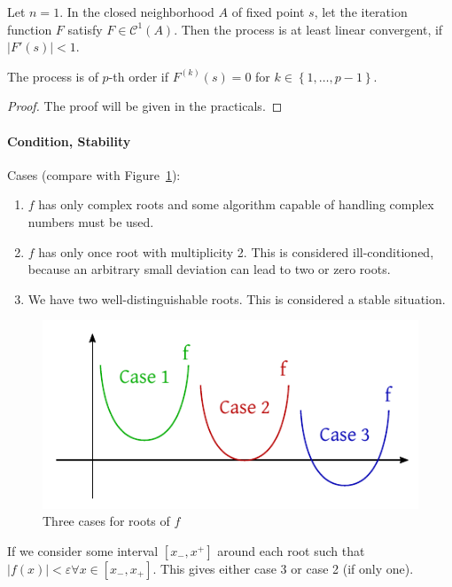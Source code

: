 \documentclass[a4paper]{article}
\numberwithin{lecref}{section}
\theoremstyle{break}
\newcommand{\Abs}[1]{\left|#1\right|}
\newcommand{\Set}[1]{\left\{#1\right\}}
\begin{document}
\begin{theorem}
  \label{theorem:6-5}
  Let $n=1$. In the closed neighborhood $A$ of fixed point $s$, let the iteration function $F$ satisfy $F \in \mathcal C^1(A)$.
  Then the process is at least linear convergent, if $\Abs{F'(s)} < 1$.

  The process is of $p$-th order if $F^{(k)}(s) = 0$ for $k \in \Set{1, \dots, p-1}$.
\end{theorem}

\begin{proof}
  The proof will be given in the practicals.
\end{proof}

\paragraph{Condition, Stability}

Cases (compare with Figure~\ref{fig:three-cases}):
\begin{enumerate}
  \item $f$ has only complex roots and some algorithm capable of handling complex numbers must be used.
  \item $f$ has only once root with multiplicity 2. This is considered ill-conditioned, because an arbitrary small deviation can lead to two or zero roots.
  \item We have two well-distinguishable roots. This is considered a stable situation.
\end{enumerate}

\begin{figure}[!ht]
  \begin{center}
    \includegraphics{img/three_cases.pdf}
    \caption{Three cases for roots of $f$}
    \label{fig:three-cases}
  \end{center}
\end{figure}

If we consider some interval $[x_-, x^+]$ around each root such that $\Abs{f(x)} < \varepsilon \forall x \in [x_-, x_+]$.
This gives either case 3 or case 2 (if only one).
\end{document}
